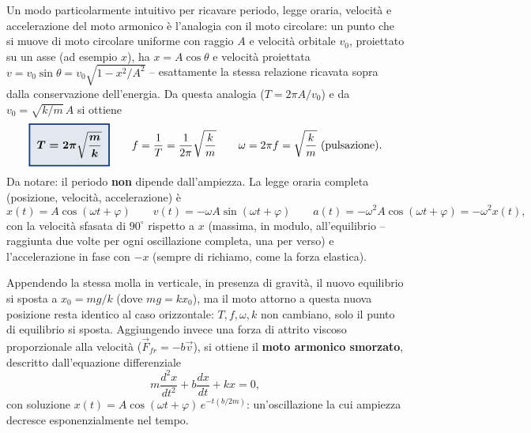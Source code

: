 \documentclass[a4paper,11pt]{article}
\newcommand{\keyeq}[1]{{\setlength{\fboxsep}{6pt}\setlength{\fboxrule}{1.3pt}\fcolorbox{chapblue}{chapblue!12}{\boldmath$\displaystyle #1$}}}
\begin{document}
Un modo particolarmente intuitivo per ricavare periodo, legge oraria, velocità e accelerazione del moto armonico è l'analogia con il moto circolare: un punto che si muove di moto circolare uniforme con raggio $A$ e velocità orbitale $v_0$, proiettato su un asse (ad esempio $x$), ha $x=A\cos\theta$ e velocità proiettata $v=v_0\sin\theta=v_0\sqrt{1-x^2/A^2}$ -- esattamente la stessa relazione ricavata sopra dalla conservazione dell'energia. Da questa analogia ($T=2\pi A/v_0$) e da $v_0=\sqrt{k/m}\,A$ si ottiene
\[
\keyeq{T = 2\pi\sqrt{\frac{m}{k}}} \qquad f=\frac1T=\frac{1}{2\pi}\sqrt{\frac{k}{m}} \qquad \omega = 2\pi f = \sqrt{\frac{k}{m}} \ \text{(pulsazione)}.
\]
Da notare: il periodo \textbf{non} dipende dall'ampiezza. La legge oraria completa (posizione, velocità, accelerazione) è
\[
x(t)=A\cos(\omega t+\varphi) \qquad v(t)=-\omega A\sin(\omega t+\varphi) \qquad a(t)=-\omega^2A\cos(\omega t+\varphi)=-\omega^2x(t),
\]
con la velocità sfasata di $90^{\circ}$ rispetto a $x$ (massima, in modulo, all'equilibrio -- raggiunta due volte per ogni oscillazione completa, una per verso) e l'accelerazione in fase con $-x$ (sempre di richiamo, come la forza elastica).

\begin{center}
\begin{minipage}{\linewidth}
\centering
{}
\end{minipage}
\end{center}

Appendendo la stessa molla in verticale, in presenza di gravità, il nuovo equilibrio si sposta a $x_0=mg/k$ (dove $mg=kx_0$), ma il moto attorno a questa nuova posizione resta identico al caso orizzontale: $T,f,\omega,k$ non cambiano, solo il punto di equilibrio si sposta. Aggiungendo invece una forza di attrito viscoso proporzionale alla velocità ($\vec F_{fr}=-b\vec v$), si ottiene il \textbf{moto armonico smorzato}, descritto dall'equazione differenziale
\[
m\frac{d^2x}{dt^2}+b\frac{dx}{dt}+kx=0,
\]
con soluzione $x(t)=A\cos(\omega t+\varphi)\,e^{-t(b/2m)}$: un'oscillazione la cui ampiezza decresce esponenzialmente nel tempo.
\end{document}
